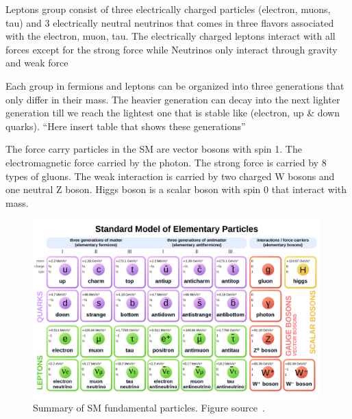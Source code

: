 Leptons group consist of three electrically charged particles (electron, muons, tau) and 3 electrically neutral neutrinos that comes in three flavors associated with the electron, muon, tau. The electrically charged leptons interact with all forces except for the strong force while Neutrinos only interact through gravity and weak force

Each group in fermions and leptons can be organized into three generations that only differ in their mass. The heavier generation can decay into the next lighter generation till we reach the lightest one that is stable like (electron, up & down quarks). “Here insert table that shows these generations”

The force carry particles in the SM are vector bosons with spin 1. The electromagnetic force carried by the photon. The strong force is carried by 8 types of gluons. The weak interaction is carried by two charged W bosons and one neutral Z boson. Higgs boson is a scalar boson with spin 0 that interact with mass.











\begin{figure}[t!]
\centering
\includegraphics[width=0.99\textwidth]{figures/SMtable.png}
\caption[Summary of standard model fundamental particles]{Summary of SM fundamental particles. Figure source~\cite{SMtable}.
\label{fig:SMParticles}}
\end{figure}


